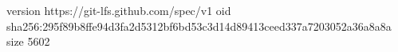 version https://git-lfs.github.com/spec/v1
oid sha256:295f89b8ffe94d3fa2d5312bf6bd53c3d14d89413ceed337a7203052a36a8a8a
size 5602
